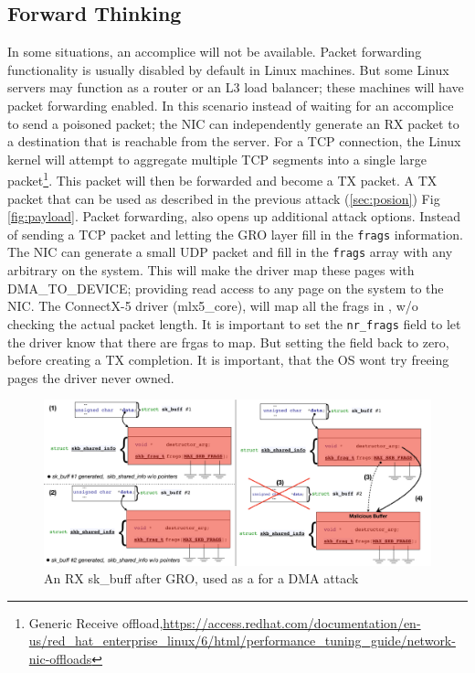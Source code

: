 \subsection{Forward Thinking}
In some situations, an accomplice will not be available. Packet forwarding functionality is usually disabled by default in Linux machines. But some Linux servers may function as a router or an L3 load balancer; these machines will have packet forwarding enabled. In this scenario instead of waiting for an accomplice to send a poisoned packet; the NIC can independently generate an RX packet to a destination that is reachable from the server. For a TCP connection, the Linux kernel will attempt to aggregate multiple TCP segments into a single large packet\footnote{Generic Receive offload,\url{https://access.redhat.com/documentation/en-us/red_hat_enterprise_linux/6/html/performance_tuning_guide/network-nic-offloads}}. This packet will then be forwarded and become a TX packet. A TX packet that can be used as described in the previous attack (\ref{sec:posion}) Fig \ref{fig:payload}. \newline
Packet forwarding, also opens up additional attack options. Instead of sending a TCP packet and letting the GRO layer fill in the \texttt{frags} information. The NIC can generate a small UDP packet and fill in the \texttt{frags} array with any arbitrary \page on the system. This will make the driver map these pages with DMA\_TO\_DEVICE; providing read access to any page on the system to the NIC. The ConnectX-5 driver (mlx5\_core), will map all the frags in \shinfo, w/o checking the actual packet length. It is important to set the \texttt{nr\_frags} field to let the driver know that there are frgas to map. But setting the field back to zero, before creating a TX completion. It is important, that the OS wont try freeing pages the driver never owned.

\begin{figure}[t]
    \centering
    \includegraphics[width=1.1\linewidth]{figs/gro.pdf}
    \caption{An RX sk\_buff after GRO, used as a \means for a DMA attack}
    \label{fig:gro}
\end{figure}

